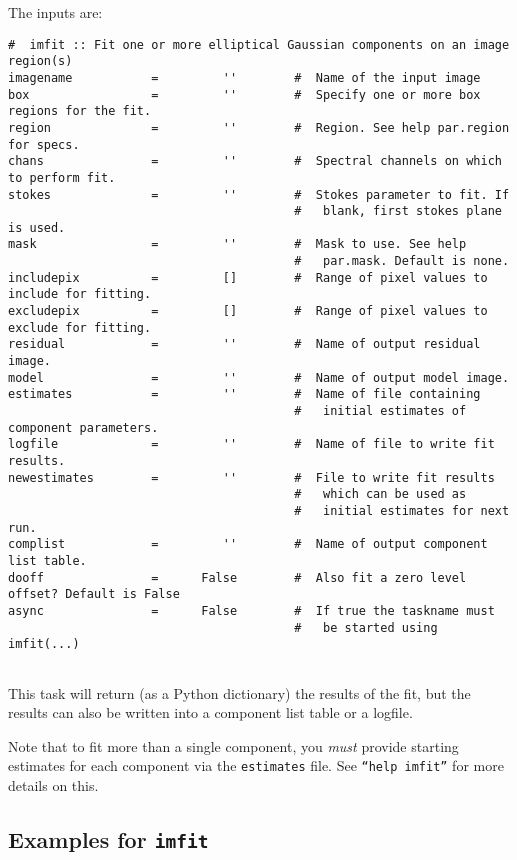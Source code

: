 The inputs are:
\small
\begin{verbatim}
#  imfit :: Fit one or more elliptical Gaussian components on an image region(s)
imagename           =         ''        #  Name of the input image
box                 =         ''        #  Specify one or more box regions for the fit.
region              =         ''        #  Region. See help par.region for specs.
chans               =         ''        #  Spectral channels on which to perform fit.
stokes              =         ''        #  Stokes parameter to fit. If
                                        #   blank, first stokes plane is used.
mask                =         ''        #  Mask to use. See help
                                        #   par.mask. Default is none.
includepix          =         []        #  Range of pixel values to include for fitting.
excludepix          =         []        #  Range of pixel values to exclude for fitting.
residual            =         ''        #  Name of output residual image.
model               =         ''        #  Name of output model image.
estimates           =         ''        #  Name of file containing
                                        #   initial estimates of component parameters.
logfile             =         ''        #  Name of file to write fit results.
newestimates        =         ''        #  File to write fit results
                                        #   which can be used as
                                        #   initial estimates for next run.
complist            =         ''        #  Name of output component list table.
dooff               =      False        #  Also fit a zero level offset? Default is False
async               =      False        #  If true the taskname must
                                        #   be started using imfit(...)


\end{verbatim}
\normalsize
This task will return (as a Python dictionary) the results of the fit,
but the results can also be written into a component list table or a
logfile. 
 
Note that to fit more than a single component, you {\em must} provide
starting estimates for each component via the {\tt estimates} file.
See {\tt ``help imfit''} for more details on this.

\subsection{Examples for {\tt imfit}}
\label{section:analysis.imfit.examples}

